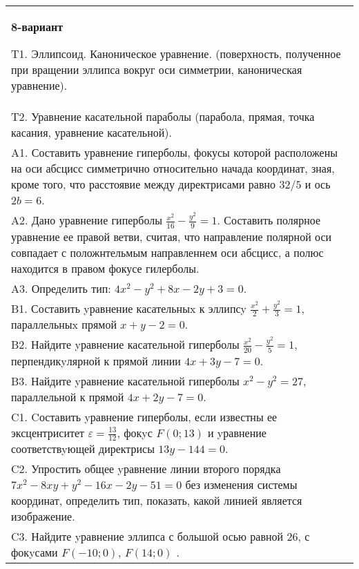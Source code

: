 \documentclass{article}
\begin{document}
\begin{tabular}{m{17cm}}
\textbf{8-вариант}
\newline

T1. Эллипсоид. Каноническое уравнение. (поверхность, полученное при вращении эллипса вокруг оси симметрии, каноническая уравнение).\\

T2. Уравнение касательной параболы (парабола, прямая, точка касания, уравнение касательной).\\

A1. Составить уравнение гиперболы, фокусы которой расположены на оси абсцисс симметрично относительно начада координат, зная, кроме того, что расстоявие между директрисами равно $32/5$ и ось $2b=6$.\\

A2. Дано уравнение гиперболы $\frac{x^{2}}{16}-\frac{y^{2}}{9}=1$. Составить полярное уравнение ее правой ветви, считая, что направление полярной оси совпадает с положнтельмым направленнем оси абсцисс, а полюс находится в правом фокусе гилерболы.\\

A3. Определить тип: $4x^{2}-y^{2}+8x-2y+3=0$.\\

B1. Составить yравнение касательныx к эллипсy $\frac{x^{2}}{2} + \frac{y^{2}}{3} = 1$, параллельныx прямой $x + y - 2 = 0$.  \\

B2. Найдите yравнение касательной гиперболы $\frac{x^{2}}{20} - \frac{y^{2}}{5} = 1$, перпендикyлярной к прямой линии $4x + 3y - 7 = 0$.  \\

B3. Найдите yравнение касательной гиперболы $x^{2} - y^{2} = 27$, параллельной к прямой $4x + 2y - 7 = 0$.  \\

C1. Cоставить yравнение гиперболы, если известны ее эксцентриситет $\varepsilon=\frac{13}{12}$, фокyс $F(0;13)$ и yравнение соответствyющей директрисы $13y-144=0$.  \\

C2. Упростить общее yравнение линии второго порядка $7x^{2}-8xy+y^{2}-16x-2y-51=0$ без изменения системы координат, определить тип, показать, какой линией является изображение.\\

C3. Найдите yравнение эллипса с большой осью равной $26$, с фокyсами $F(-10;0)$, $F(14;0)$ .  \\

\end{tabular}
\vspace{1cm}
\end{document}
